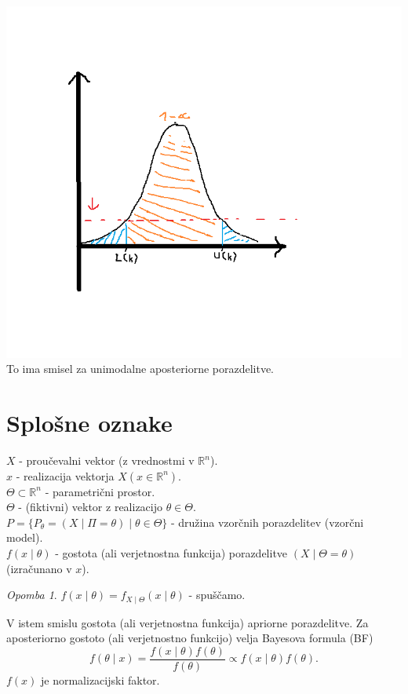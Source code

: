 \documentclass[a4paper, 12pt]{book}
\theoremstyle{definition}
\theoremstyle{remark}
\newtheorem*{rem}{Opomba}
\newcommand{\R}{\mathbb{R}}
\begin{document}
\includegraphics[scale=0.5]{interval_kredibilnostni_1_5} \\
To ima smisel za unimodalne aposteriorne porazdelitve.


\section{Splošne oznake}

$X$ - proučevalni vektor (z vrednostmi v $\R^n$). \\
$x$ - realizacija vektorja $X (x \in \R^n)$. \\
$\Theta \subset \R^n$ - parametrični prostor. \\
$\Theta$ - (fiktivni) vektor z realizacijo $\theta \in \Theta$. \\
$P = \{P_{\theta} = (X \mid \Pi = \theta) \mid \theta \in \Theta\}$ - družina vzorčnih porazdelitev (vzorčni model). \\
$f(x \mid \theta)$ - gostota (ali verjetnostna funkcija) porazdelitve $(X \mid \Theta = \theta)$
(izračunano v $x$). \\
\begin{rem}
  $f(x \mid \theta) = f_{X \mid \Theta}(x \mid \theta)$ - spuščamo.
\end{rem}
V istem smislu gostota (ali verjetnostna funkcija) apriorne porazdelitve.
Za aposteriorno gostoto (ali verjetnostno funkcijo) velja Bayesova formula (BF)
\begin{equation*}
  f(\theta \mid x) = \frac{f(x \mid \theta) f(\theta)}{f(\theta)} \propto f(x \mid \theta) f(\theta).
\end{equation*}
$f(x)$ je normalizacijski faktor.
\end{document}
